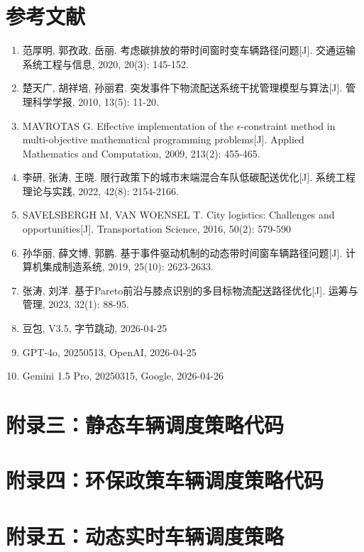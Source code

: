 \documentclass[12pt,a4paper]{article}
\begin{document}
\newpage
\section{参考文献}
\begin{enumerate}
    \renewcommand{\labelenumi}{[\arabic{enumi}]}
    \item \label{ref1} 范厚明, 郭孜政, 岳丽. 考虑碳排放的带时间窗时变车辆路径问题[J]. 交通运输系统工程与信息, 2020, 20(3): 145-152.
    \item \label{ref2} 楚天广, 胡祥培, 孙丽君. 突发事件下物流配送系统干扰管理模型与算法[J]. 管理科学学报, 2010, 13(5): 11-20.
    \item\label{ref3} MAVROTAS G. Effective implementation of the $\epsilon$-constraint method in multi-objective mathematical programming problems[J]. Applied Mathematics and Computation, 2009, 213(2): 455-465.
    \item\label{ref4} 李研, 张涛, 王晓. 限行政策下的城市末端混合车队低碳配送优化[J]. 系统工程理论与实践, 2022, 42(8): 2154-2166.
    \item\label{ref5} SAVELSBERGH M, VAN WOENSEL T. City logistics: Challenges and opportunities[J]. Transportation Science, 2016, 50(2): 579-590
    \item \label{ref6}孙华丽, 薛文博, 郭鹏. 基于事件驱动机制的动态带时间窗车辆路径问题[J]. 计算机集成制造系统, 2019, 25(10): 2623-2633.
    \item\label{ref7} 张涛, 刘洋. 基于Pareto前沿与膝点识别的多目标物流配送路径优化[J]. 运筹与管理, 2023, 32(1): 88-95.
    \item 豆包, V3.5, 字节跳动, 2026-04-25
    \item GPT-4o, 20250513, OpenAI, 2026-04-25
    \item Gemini 1.5 Pro, 20250315, Google, 2026-04-26

\end{enumerate}

\newpage
\appendix


\newpage


\newpage
\section{附录三：静态车辆调度策略代码}


\newpage
\section{附录四：环保政策车辆调度策略代码}


\newpage
\section{附录五：动态实时车辆调度策略}

\end{document}
